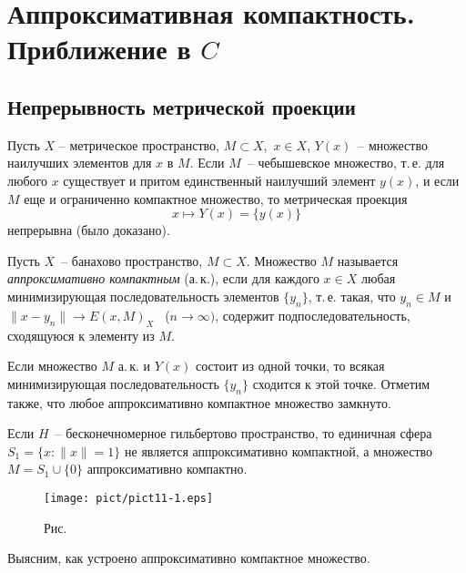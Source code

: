
\chapter{Аппроксимативная компактность. Приближение в \boldmath $C$}

\section{Непрерывность метрической проекции}

Пусть {$X$ -- метрическое пространство,} $M\subset X$,\  $x\in X$,
$Y(x)$~-- множество наилучших элементов для $x$ {в $M$}. Если $M$~--
чебышевское множество, т.\,е. для любого $x$ существует и притом единственный
наилучший элемент {$y(x)$}, и если $M$ еще и ограниченно компактное множество,
то метрическая проекция
$$
x\longmapsto Y(x)=\{y(x)\}
$$
непрерывна (было доказано).

Пусть $X$~-- банахово пространство, $M\subset X$. Множество $M$
называется \textit{аппроксимативно компактным} (а.\,к.), если для каждого $x\in
X$ любая минимизирующая последовательность элементов $\{y_n\}$,
т.\,е. такая, что $y_n\in M$ и $\|x-y_n\|\to E(x,M)_X$~ ($n\to\infty)$, содержит
подпоследовательность, сходящуюся к элементу из $M$.

Если множество $M$ а.\,к. и $Y(x)$ состоит из одной точки, то всякая
минимизирующая последовательность $\{y_n\}$ сходится к этой точке.
Отметим также, что любое аппроксимативно компактное множество
замкнуто.

\begin{Example}
Если $H$~-- бесконечномерное гильбертово пространство, то единичная
сфера $S_1=\{x\colon\|x\|=1\}$ не является аппроксимативно
компактной, а множество $M=S_1\cup\{0\}$ аппроксимативно компактно.
\begin{figure}[ht]
\begin{center}
\texttt{[image: pict/pict11-1.eps]}
\end{center}
 \bigskip
 \label{r11-1}

 \centerline{Рис.~\theris}
\end{figure}
\end{Example}

Выясним, как устроено аппроксимативно компактное множество.

